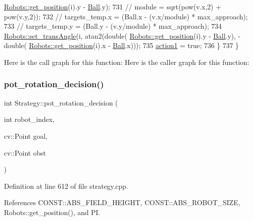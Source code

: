 \begin{DoxyCode}
      \hyperlink{class_robots_a1fca8f2f5070176faa6ba1efa2f1ff14}{Robots::get\_position}(i).y - \hyperlink{class_strategy_abd16b6276e747f6cd99a19963ff5495b}{Ball}.y);
731         \textcolor{comment}{// module = sqrt(pow(v.x,2) + pow(v.y,2));}
732         \textcolor{comment}{// targets\_temp.x = (Ball.x - (v.x/module) * max\_approach);}
733         \textcolor{comment}{// targets\_temp.y = (Ball.y - (v.y/module) * max\_approach);}
734         \hyperlink{class_robots_ac18c807efc15557ce996563bb76451ea}{Robots::set\_transAngle}(i, atan2(\textcolor{keywordtype}{double}(
      \hyperlink{class_robots_a1fca8f2f5070176faa6ba1efa2f1ff14}{Robots::get\_position}(i).y - \hyperlink{class_strategy_abd16b6276e747f6cd99a19963ff5495b}{Ball}.y), - \textcolor{keywordtype}{double}(
      \hyperlink{class_robots_a1fca8f2f5070176faa6ba1efa2f1ff14}{Robots::get\_position}(i).x - \hyperlink{class_strategy_abd16b6276e747f6cd99a19963ff5495b}{Ball}.x)));
735         \hyperlink{class_strategy_a4de1cb2a30b7eb871e68ddefd03f6089}{action1} = \textcolor{keyword}{true};
736     \}
737 \}
\end{DoxyCode}
Here is the call graph for this function\+:
Here is the caller graph for this function\+:
\mbox{\label{class_strategy_abc4ef2ab65f3864218c1736d7c35d46a}} 
\subsubsection{\texorpdfstring{pot\+\_\+rotation\+\_\+decision()}{pot\_rotation\_decision()}}
{\footnotesize\ttfamily int Strategy\+::pot\+\_\+rotation\+\_\+decision (\begin{DoxyParamCaption}\item[{int}]{robot\+\_\+index,  }\item[{cv\+::\+Point}]{goal,  }\item[{cv\+::\+Point}]{obst }\end{DoxyParamCaption})}



Definition at line 612 of file strategy.\+cpp.



References C\+O\+N\+S\+T\+::\+A\+B\+S\+\_\+\+F\+I\+E\+L\+D\+\_\+\+H\+E\+I\+G\+HT, C\+O\+N\+S\+T\+::\+A\+B\+S\+\_\+\+R\+O\+B\+O\+T\+\_\+\+S\+I\+ZE, Robots\+::get\+\_\+position(), and PI.



